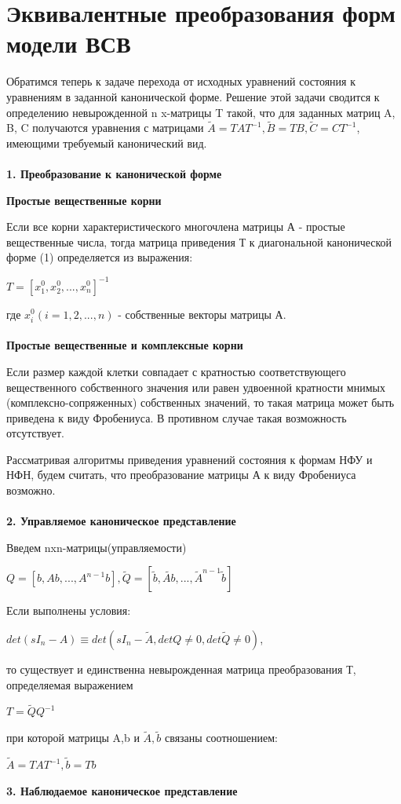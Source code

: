 \documentclass[12pt,a4paper,oneside]{article}
\begin{document}
\section*{Эквивалентные преобразования форм модели ВСВ}
Обратимся теперь к задаче перехода от исходных уравнений состояния к уравнениям в заданной канонической форме. Решение этой задачи сводится к определению невырожденной n x-матрицы T такой, что для заданных матриц A, B, C получаются уравнения с матрицами $\widetilde{A}=TAT^{-1}, \widetilde{B}=TB, \widetilde{C}=CT^{-1}$, имеющими требуемый канонический вид.\\\\
\textbf{1. Преобразование к канонической форме}

\textbf{Простые вещественные корни}

Если все корни характеристического многочлена матрицы А - простые вещественные числа, тогда матрица приведения Т к диагональной канонической форме (1) определяется из выражения:
\begin{center}
$T=[x^0_1, x^0_2,..., x^0_n]^{-1}$
\end{center}
где $x^0_i(i=1,2,...,n)$ - собственные векторы матрицы А.\\\\
\textbf{Простые вещественные и комплексные корни}

Если размер каждой клетки совпадает с кратностью соответствующего вещественного собственного значения или равен удвоенной кратности мнимых
(комплексно-сопряженных) собственных значений, то такая матрица может быть приведена к виду Фробениуса. В противном случае такая возможность отсутствует.

Рассматривая алгоритмы приведения уравнений состояния к формам НФУ и НФН, будем считать, что преобразование матрицы А к виду Фробениуса возможно.\\\\
\textbf{2. Управляемое каноническое представление}

Введем nxn-матрицы(управляемости)
\begin{center}
$Q=[b, Ab, ..., A^{n-1}b], \widetilde{Q}=[\widetilde{b}, \widetilde{Ab}, ..., \widetilde{A}^{n-1}\widetilde{b}]$
\end{center}
Если выполнены условия:
\begin{center}
$det(sI_n-A)\equiv det(sI_n-\widetilde{A}, detQ\neq0, det\widetilde{Q}\neq0)$, 
\end{center}
то существует и единственна невырожденная матрица преобразования Т, определяемая выражением
\begin{center}
	$T=\widetilde{Q}Q^{-1}$
\end{center}
при которой матрицы A,b и $\widetilde{A}, \widetilde{b}$ связаны соотношением:
\begin{center}
	$\widetilde{A}=TAT^{-1}, \widetilde{b}=Tb$
\end{center}
\textbf{3. Наблюдаемое каноническое представление}
\end{document}
